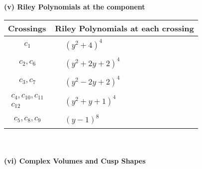 \documentclass[1p]{elsarticle_modified}
\theoremstyle{definition}
\begin{document}
\newpage\renewcommand{\arraystretch}{1}
\flushleft \textbf{(v) Riley Polynomials at the component}\newline \\
\begin{tabular}{m{50pt}|m{274pt}}
Crossings & \hspace{64pt}Riley Polynomials at each crossing \\
\hline $$\begin{aligned}c_{1}\end{aligned}$$&$\begin{aligned}
&(y^2+4)^4
\end{aligned}$\\
\hline $$\begin{aligned}c_{2},c_{6}\end{aligned}$$&$\begin{aligned}
&(y^2+2 y+2)^4
\end{aligned}$\\
\hline $$\begin{aligned}c_{3},c_{7}\end{aligned}$$&$\begin{aligned}
&(y^2-2 y+2)^4
\end{aligned}$\\
\hline $$\begin{aligned}c_{4},c_{10},c_{11}\\c_{12}\end{aligned}$$&$\begin{aligned}
&(y^2+y+1)^4
\end{aligned}$\\
\hline $$\begin{aligned}c_{5},c_{8},c_{9}\end{aligned}$$&$\begin{aligned}
&(y-1)^8
\end{aligned}$\\
\hline
\end{tabular}\\~\\
\newpage\flushleft \textbf{(vi) Complex Volumes and Cusp Shapes}
\end{document}
